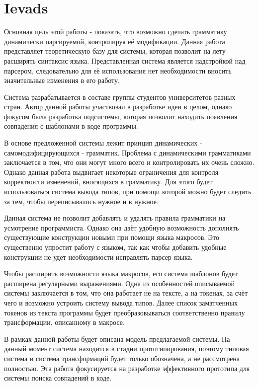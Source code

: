 \documentclass[12pt, a4paper]{report}
\begin{document}
\titullapa



\setcounter{tocdepth}{4}
\tableofcontents



%

\section{Ievads}
Основная цель этой работы - показать, что возможно сделать грамматику динамически парсируемой, контролируя её модификации. Данная работа представляет теоретическую базу для системы, которая позволит на лету расширять синтаксис языка. Представленная система является надстройкой над парсером, следовательно для её использования нет необходимости вносить значительные изменения в его работу.

Система разрабатывается в составе группы студентов университетов разных стран. Автор данной работы участвовал в разработке идеи в целом, однако фокусом была разработка подсистемы, которая позволит находить появления совпадения с шаблонами в коде программы.

В основе предложенной системы лежит принцип динамических - самомодифицирующихся - грамматик. Проблема с динамическими грамматиками заключается в том, что они могут много всего и контролировать их очень сложно. Однако данная работа выдвигает некоторые ограничения для контроля корректности изменений, вносящихся в грамматику. Для этого будет использоваться система вывода типов, при помощи которой можно будет следить за тем, чтобы переписывалось нужное и в нужное.

Данная система не позволит добавлять и удалять правила грамматики на усмотрение программиста. Однако она даёт удобную возможность дополнять существующие конструкции новыми при помощи языка макросов. Это существенно упростит работу с языком, так как чтобы добавить удобные конструкции не  удет необходимости исправлять парсер языка.

Чтобы расширить возможности языка макросов, его система шаблонов будет расширена регулярными выражениями. Одна из особенностей описываемой системы заключается в том, что она работает не на тексте, а на токенах, за счёт чего и возможно устроить систему вывода типов. Далее список заматченных токенов из текста программы будет преобразовываться соответственно правилу трансформации, описанному в макросе.

В рамках данной работы будет описана модель предлагаемой системы. На данный момент система находится в стадии прототипирования, поэтому типовая система и система трансформаций будет только обозначена, а не рассмотрена полностью. Эта работа фокусируется на разработке эффективного прототипа для системы поиска совпадений в коде.
\end{document}
